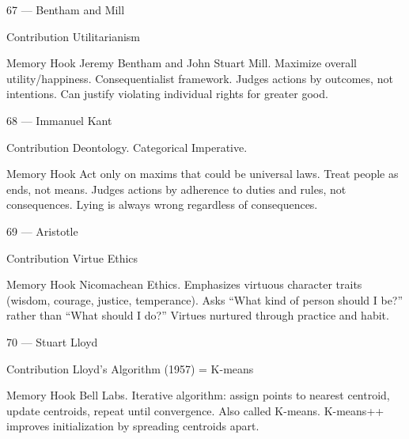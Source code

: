 \documentclass[aspectratio=169,8pt]{beamer}
\begin{document}
	\begin{frame}{67 --- Bentham and Mill}
		\begin{block}{Contribution}
			Utilitarianism
		\end{block}
		\begin{block}{Memory Hook}
			Jeremy Bentham and John Stuart Mill. Maximize overall utility/happiness. Consequentialist framework. Judges actions by outcomes, not intentions. Can justify violating individual rights for greater good.
		\end{block}
	\end{frame}
	
	\begin{frame}{68 --- Immanuel Kant}
		\begin{block}{Contribution}
			Deontology. Categorical Imperative.
		\end{block}
		\begin{block}{Memory Hook}
			Act only on maxims that could be universal laws. Treat people as ends, not means. Judges actions by adherence to duties and rules, not consequences. Lying is always wrong regardless of consequences.
		\end{block}
	\end{frame}
	
	\begin{frame}{69 --- Aristotle}
		\begin{block}{Contribution}
			Virtue Ethics
		\end{block}
		\begin{block}{Memory Hook}
			Nicomachean Ethics. Emphasizes virtuous character traits (wisdom, courage, justice, temperance). Asks ``What kind of person should I be?'' rather than ``What should I do?'' Virtues nurtured through practice and habit.
		\end{block}
	\end{frame}
	
	\begin{frame}{70 --- Stuart Lloyd}
		\begin{block}{Contribution}
			Lloyd's Algorithm (1957) = K-means
		\end{block}
		\begin{block}{Memory Hook}
			Bell Labs. Iterative algorithm: assign points to nearest centroid, update centroids, repeat until convergence. Also called K-means. K-means++ improves initialization by spreading centroids apart.
		\end{block}
	\end{frame}
	
\end{document}
